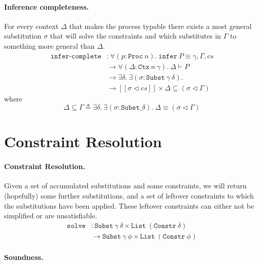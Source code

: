 \documentclass[sigplan,screen,review]{acmart}
\begin{document}
\paragraph{Inference completeness.}

For every context \(\Delta\) that makes the process typable there exists
a most general substitution \(\sigma\) that will solve the constraints
and which substitutes in \(\Gamma\) to something more general than
\(\Delta\). \[
\begin{aligned}
\texttt{infer-complete} &: \forall (p : \texttt{Proc}~n). ~ \texttt{infer}~P \equiv \gamma , \Gamma , cs \\
&\to \forall (\Delta : \texttt{Ctx}~n~\gamma). ~ \Delta \vdash P \\
&\to \exists \delta. ~ \exists (\sigma : \texttt{Subst}~\gamma~\delta). \\
&\to [\![ \sigma \triangleleft cs ]\!] \times \Delta \subseteq (\sigma \triangleleft \Gamma)
\end{aligned}
\] where \[
\Delta \subseteq \Gamma \triangleq \exists \delta. ~ \exists (\sigma : \texttt{Subst} \_ \delta). ~ \Delta \equiv (\sigma \triangleleft \Gamma)
\]

\hypertarget{constraint-resolution}{%
\section{Constraint Resolution}\label{constraint-resolution}}

\paragraph{Constraint Resolution.}

Given a set of accumulated substitutions and some constraints, we will
return (hopefully) some further substitutions, and a set of leftover
constraints to which the substitutions have been applied. These leftover
constraints can either not be simplified or are unsatisfiable. \[
\begin{aligned}
\texttt{solve} &: \texttt{Subst}~\gamma~\delta \times \texttt{List}~(\texttt{Constr}~\delta) \\
&\to \texttt{Subst}~\gamma~\phi \times \texttt{List}~(\texttt{Constr}~\phi)
\end{aligned}
\]

\paragraph{Soundness.}
\end{document}
